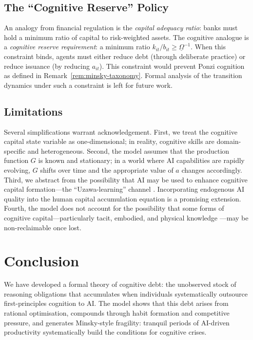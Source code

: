 \documentclass[12pt]{article}
\begin{document}
\subsection{The ``Cognitive Reserve'' Policy}

An analogy from financial regulation is the \emph{capital adequacy ratio}: banks
must hold a minimum ratio of capital to risk-weighted assets. The cognitive analogue
is a \emph{cognitive reserve requirement}: a minimum ratio $k_{it} / b_{it} \geq
\underline{\Omega}^{-1}$. When this constraint binds, agents must either reduce debt
(through deliberate practice) or reduce issuance (by reducing $a_{it}$). This
constraint would prevent Ponzi cognition as defined in Remark~\ref{rem:minsky-taxonomy}.
Formal analysis of the transition dynamics under such a constraint is left for
future work.

\subsection{Limitations}

Several simplifications warrant acknowledgement. First, we treat the cognitive capital
state variable as one-dimensional; in reality, cognitive skills are domain-specific
and heterogeneous. Second, the model assumes that the production function $G$ is
known and stationary; in a world where AI capabilities are rapidly evolving, $G$
shifts over time and the appropriate value of $a$ changes accordingly.
Third, we abstract from the possibility that AI may be used to enhance cognitive
capital formation---the ``Uzawa-learning'' channel \citep{Uzawa1965, Lucas1988}.
Incorporating endogenous AI quality into the human capital accumulation equation is
a promising extension. Fourth, the model does not account for the possibility that
some forms of cognitive capital---particularly tacit, embodied, and physical knowledge
\citep{Aschenbrenner2024}---may be non-reclaimable once lost.

\section{Conclusion}
\label{sec:conclusion}

We have developed a formal theory of cognitive debt: the unobserved stock of
reasoning obligations that accumulates when individuals systematically outsource
first-principles cognition to AI. The model shows that this debt arises from
rational optimisation, compounds through habit formation and competitive pressure,
and generates Minsky-style fragility: tranquil periods of AI-driven productivity
systematically build the conditions for cognitive crises.
\end{document}
